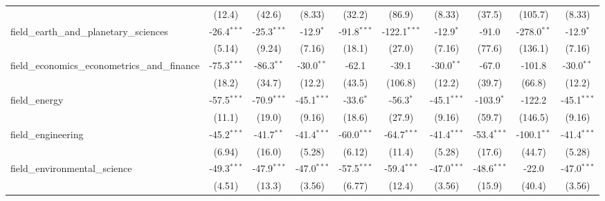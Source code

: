 \begin{tabular}{lccccccccc}
                                                               & (12.4)         & (42.6)         & (8.33)        & (32.2)         & (86.9)         & (8.33)        & (37.5)         & (105.7)        & (8.33)\\   
   field\_earth\_and\_planetary\_sciences                      & -26.4$^{***}$  & -25.3$^{***}$  & -12.9$^{*}$   & -91.8$^{***}$  & -122.1$^{***}$ & -12.9$^{*}$   & -91.0          & -278.0$^{**}$  & -12.9$^{*}$\\   
                                                               & (5.14)         & (9.24)         & (7.16)        & (18.1)         & (27.0)         & (7.16)        & (77.6)         & (136.1)        & (7.16)\\   
   field\_economics\_econometrics\_and\_finance                & -75.3$^{***}$  & -86.3$^{**}$   & -30.0$^{**}$  & -62.1          & -39.1          & -30.0$^{**}$  & -67.0          & -101.8         & -30.0$^{**}$\\   
                                                               & (18.2)         & (34.7)         & (12.2)        & (43.5)         & (106.8)        & (12.2)        & (39.7)         & (66.8)         & (12.2)\\   
   field\_energy                                               & -57.5$^{***}$  & -70.9$^{***}$  & -45.1$^{***}$ & -33.6$^{*}$    & -56.3$^{*}$    & -45.1$^{***}$ & -103.9$^{*}$   & -122.2         & -45.1$^{***}$\\   
                                                               & (11.1)         & (19.0)         & (9.16)        & (18.6)         & (27.9)         & (9.16)        & (59.7)         & (146.5)        & (9.16)\\   
   field\_engineering                                          & -45.2$^{***}$  & -41.7$^{**}$   & -41.4$^{***}$ & -60.0$^{***}$  & -64.7$^{***}$  & -41.4$^{***}$ & -53.4$^{***}$  & -100.1$^{**}$  & -41.4$^{***}$\\   
                                                               & (6.94)         & (16.0)         & (5.28)        & (6.12)         & (11.4)         & (5.28)        & (17.6)         & (44.7)         & (5.28)\\   
   field\_environmental\_science                               & -49.3$^{***}$  & -47.9$^{***}$  & -47.0$^{***}$ & -57.5$^{***}$  & -59.4$^{***}$  & -47.0$^{***}$ & -48.6$^{***}$  & -22.0          & -47.0$^{***}$\\   
                                                               & (4.51)         & (13.3)         & (3.56)        & (6.77)         & (12.4)         & (3.56)        & (15.9)         & (40.4)         & (3.56)\\   

\end{tabular}
